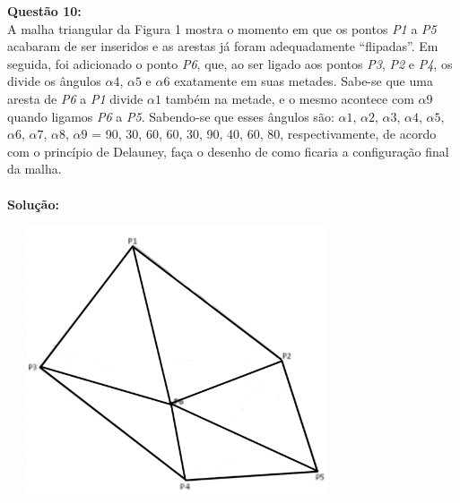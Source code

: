 \noindent\textbf{Questão 10:}\\
A malha triangular da Figura 1 mostra o momento em que os pontos \emph{P1} a \emph{P5} acabaram de
ser inseridos e as arestas já foram adequadamente “flipadas”. Em seguida, foi adicionado
o ponto \emph{P6}, que, ao ser ligado aos pontos \emph{P3}, \emph{P2} e \emph{P4}, os divide os ângulos $\alpha4$, $\alpha5$ e $\alpha6$ exatamente em suas metades. Sabe-se que uma aresta de \emph{P6} a \emph{P1} divide $\alpha1$ também na metade, e o mesmo acontece com $\alpha9$ quando ligamos \emph{P6} a \emph{P5}. Sabendo-se que esses ângulos são: $\alpha1$, $\alpha2$, $\alpha3$, $\alpha4$, $\alpha5$, $\alpha6$, $\alpha7$, $\alpha8$, $\alpha9$ = {90, 30, 60, 60, 30, 90, 40, 60, 80}, respectivamente, de acordo com o princípio de Delauney, faça o desenho de como ficaria a configuração final da malha.\\
\\
\noindent\textbf{Solução:}\\
\begin{center}
    \includegraphics[width=10cm,height=8cm]{img_06.png}
\end{center}
\vspace{1cm}

